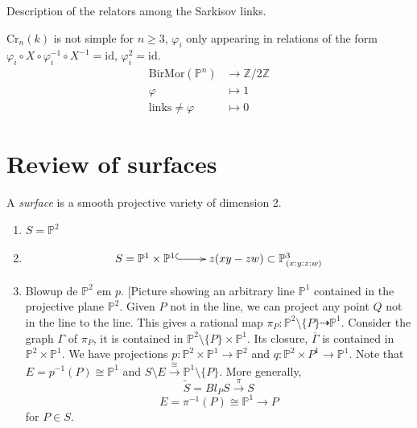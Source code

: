 \begin{theorem}
\label{theorem-blanc-lamy-zimmerman}
Description of the relators among the
Sarkisov links.
\end{theorem}

\begin{theorem}[BLZ, 2021]
\label{theorem-blz-2021}
$\text{Cr}_n(k)$ is not simple for $n \geq
3$,
$\varphi_i$ only appearing in relations of
the form
$\varphi_i \circ X \circ \varphi_i^{-1} \circ
X^{-1}=\text{id}$,
$\varphi_i^2=\text{id}$.
$$
\begin{aligned}
\text{BirMor}(\mathbb{P}^n) &\longrightarrow
\mathbb{Z}/2\mathbb{Z} \\
\varphi &\longmapsto 1\\
\text{links}\neq \varphi&\longmapsto 0
\end{aligned}
$$

\end{theorem}

\section{Review of surfaces}
\label{section-surfaces}

\begin{definition}
\label{definition-surface}
A {\it surface} is a smooth projective
variety
of dimension 2.
\end{definition}

\begin{example}
\label{example-surfaces}
\begin{enumerate}
\item $S=\mathbb{P}^2$

\item
 $$
\xymatrix{
S=\mathbb{P}^1\times \mathbb{P}^1
\ar@{^{(}->}[r]
&z(xy-zw)\subset \mathbb{P}^3_{(x:y:z:w)}
}
$$

\item Blowup de $\mathbb{P}^2$ em $p$.
[Picture showing an arbitrary line
$\mathbb{P}^1$ contained
in the projective plane $\mathbb{P}^2$.
Given $P$ not in the line,
we can project any point $Q$ not in the line
to the line.
This gives a rational map
$\pi_P:\mathbb{P}^2\setminus
\{P\}\dashrightarrow \mathbb{P}^1$.
Consider the graph $\Gamma$ of $\pi_P$,
it is contained in $\mathbb{P}^2\setminus\{
P\} \times \mathbb{P}^1$.
Its closure, $\overline{\Gamma}$
is contained in $\mathbb{P}^2\times
\mathbb{P}^1$.
We have projections $p:\mathbb{P}^2\times
\mathbb{P}^1 \to \mathbb{P}^2$
and $q:\mathbb{P}^2\times P^1\to
\mathbb{P}^1$.
Note that $E=p^{-1}(P) \cong \mathbb{P}^1$
and $S\setminus E
\xrightarrow{\cong}\mathbb{P}^1\setminus\{P\}
$.
More generally,
$$
\tilde{S}=Bl_PS \xrightarrow{\pi}S
$$
$$
E=\pi^{-1}(P)\cong \mathbb{P}^1 \to P
$$
for $P \in S$.
\end{enumerate}
\end{example}

